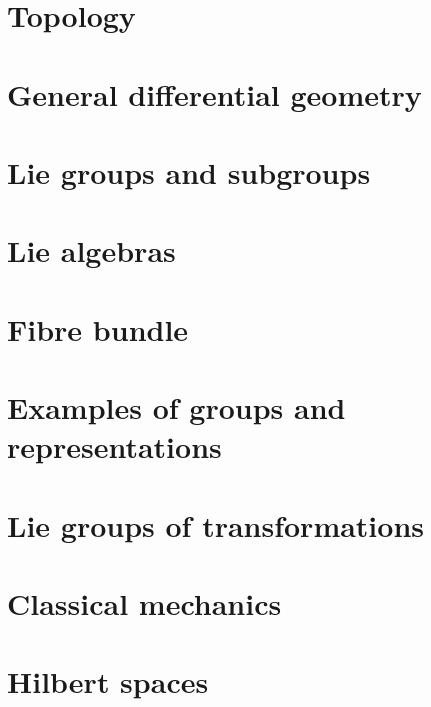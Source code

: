 \chapter{Topology}              \label{chap_topology}



\chapter{General differential geometry} \label{Chapitre_FB}


\chapter{Lie groups and subgroups}


\chapter{Lie algebras}
  
 





\chapter{Fibre bundle}



\chapter{Examples of groups and representations}        \label{ChapThoComsGroupes}



\chapter{Lie groups of transformations}


\chapter{Classical mechanics}



\chapter{Hilbert spaces}



